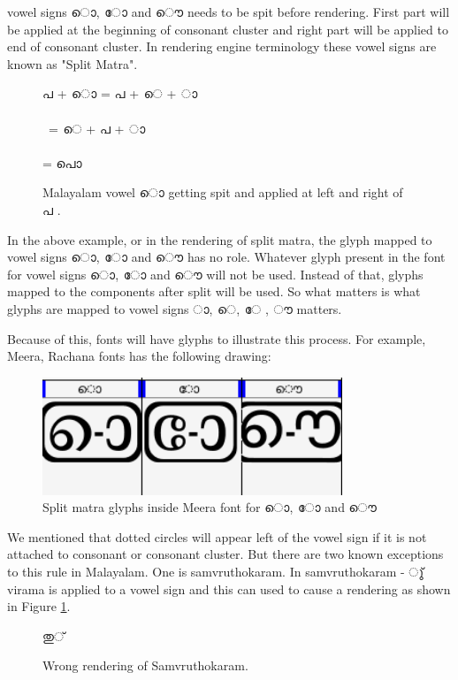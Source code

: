 vowel signs {\malayalam ൊ, ോ and ൌ} needs to be spit before rendering.
First part will be applied at the beginning of consonant cluster
and right part will be applied to end of consonant cluster. In rendering engine
terminology these vowel signs are known as "Split Matra".

\begin{figure}[h]
  {\meera\textexample ‌പ +  ൊ = പ + െ + ാ \\\\\
  = െ + പ + ാ \\\\
  = പൊ }
  \caption{Malayalam vowel  {\malayalam ൊ} getting spit and applied at left
and right of {\malayalam പ} .}
\end{figure}

In the above example, or in the rendering of split matra, the glyph mapped to
vowel signs {\malayalam ൊ, ോ and ൌ} has no role.
Whatever glyph present in the font for vowel signs {\malayalam ൊ, ോ and ൌ} will
not be used. Instead of that, glyphs mapped to the components after split will
be used. So what matters is what glyphs are mapped to vowel signs {\malayalam
‌ാ, െ, േ , ൗ  } matters.

Because of this, fonts will have glyphs to illustrate this process. For
example, Meera, Rachana fonts has the following drawing:

\begin{figure}[h]
  \includegraphics[width=0.8\textwidth]{images/malayalam-splitmatra-glyphs-meera.png}
  \caption{Split matra glyphs inside Meera font for  {\malayalam ൊ, ോ and ൌ}}
\end{figure}

We mentioned that dotted circles will appear left of the vowel sign if it is
not attached to consonant or consonant cluster.
But there are two known exceptions to this rule in Malayalam. One is
samvruthokaram.
In samvruthokaram - {\malayalam ു്} virama is applied to a vowel sign and this
can used to cause a rendering as shown in Figure \ref{WrongSamvruthokaram}.

\begin{figure}[h]
  \centering
  {\meera\textexample തു‌്}\\
  \caption{Wrong rendering of Samvruthokaram.}
  \label{WrongSamvruthokaram}
\end{figure}

